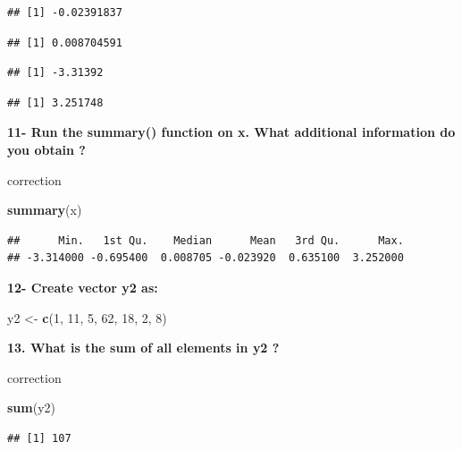 \documentclass[]{book}
\newenvironment{Shaded}{\begin{snugshade}}{\end{snugshade}}
\newcommand{\DecValTok}[1]{\textcolor[rgb]{0.00,0.00,0.81}{#1}}
\newcommand{\KeywordTok}[1]{\textcolor[rgb]{0.13,0.29,0.53}{\textbf{#1}}}
\newcommand{\NormalTok}[1]{#1}
\newcommand{\StringTok}[1]{\textcolor[rgb]{0.31,0.60,0.02}{#1}}
\begin{document}
\begin{verbatim}
## [1] -0.02391837
\end{verbatim}

\begin{verbatim}
## [1] 0.008704591
\end{verbatim}

\begin{verbatim}
## [1] -3.31392
\end{verbatim}

\begin{verbatim}
## [1] 3.251748
\end{verbatim}

\textbf{11- Run the summary() function on x. What additional information do you obtain ?}

correction

\begin{Shaded}
\begin{Highlighting}[]
\KeywordTok{summary}\NormalTok{(x)}
\end{Highlighting}
\end{Shaded}

\begin{verbatim}
##      Min.   1st Qu.    Median      Mean   3rd Qu.      Max. 
## -3.314000 -0.695400  0.008705 -0.023920  0.635100  3.252000
\end{verbatim}

\textbf{12- Create vector y2 as:}

\begin{Shaded}
\begin{Highlighting}[]
\NormalTok{y2 <-}\StringTok{ }\KeywordTok{c}\NormalTok{(}\DecValTok{1}\NormalTok{, }\DecValTok{11}\NormalTok{, }\DecValTok{5}\NormalTok{, }\DecValTok{62}\NormalTok{,  }\DecValTok{18}\NormalTok{, }\DecValTok{2}\NormalTok{, }\DecValTok{8}\NormalTok{)}
\end{Highlighting}
\end{Shaded}

\textbf{13. What is the sum of all elements in y2 ?}

correction

\begin{Shaded}
\begin{Highlighting}[]
\KeywordTok{sum}\NormalTok{(y2)}
\end{Highlighting}
\end{Shaded}

\begin{verbatim}
## [1] 107
\end{verbatim}
\end{document}
